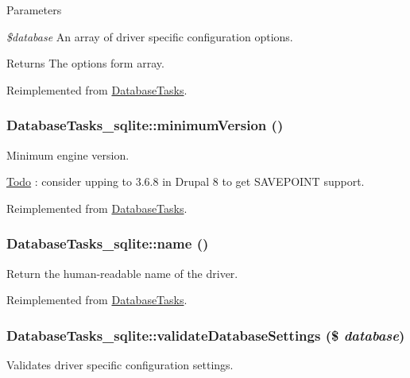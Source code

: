 \begin{DoxyParams}{Parameters}
\item[{\em \$database}]An array of driver specific configuration options.\end{DoxyParams}
\begin{DoxyReturn}{Returns}
The options form array. 
\end{DoxyReturn}


Reimplemented from \hyperlink{classDatabaseTasks_a97968c7dd7807a65a301a27ea3d15480}{DatabaseTasks}.\hypertarget{classDatabaseTasks__sqlite_ac546ff3ed7f1ece5726b3c5cd7a39ef9}{
\subsubsection[{minimumVersion}]{\setlength{\rightskip}{0pt plus 5cm}DatabaseTasks\_\-sqlite::minimumVersion ()}}
\label{classDatabaseTasks__sqlite_ac546ff3ed7f1ece5726b3c5cd7a39ef9}
Minimum engine version.

\begin{Desc}
\item[\hyperlink{todo__todo000003}{Todo}]: consider upping to 3.6.8 in Drupal 8 to get SAVEPOINT support. \end{Desc}


Reimplemented from \hyperlink{classDatabaseTasks_a840dd551944911605ee2e139a434efea}{DatabaseTasks}.\hypertarget{classDatabaseTasks__sqlite_ad31220279e6cbec9d248a66e8b51fe2f}{
\subsubsection[{name}]{\setlength{\rightskip}{0pt plus 5cm}DatabaseTasks\_\-sqlite::name ()}}
\label{classDatabaseTasks__sqlite_ad31220279e6cbec9d248a66e8b51fe2f}
Return the human-\/readable name of the driver. 

Reimplemented from \hyperlink{classDatabaseTasks_ae582e57b43461aad87f47ad0d37b6c9a}{DatabaseTasks}.\hypertarget{classDatabaseTasks__sqlite_a3d2e2aff4e7a3d890a82b057aab722c4}{
\subsubsection[{validateDatabaseSettings}]{\setlength{\rightskip}{0pt plus 5cm}DatabaseTasks\_\-sqlite::validateDatabaseSettings (\$ {\em database})}}
\label{classDatabaseTasks__sqlite_a3d2e2aff4e7a3d890a82b057aab722c4}
Validates driver specific configuration settings.

